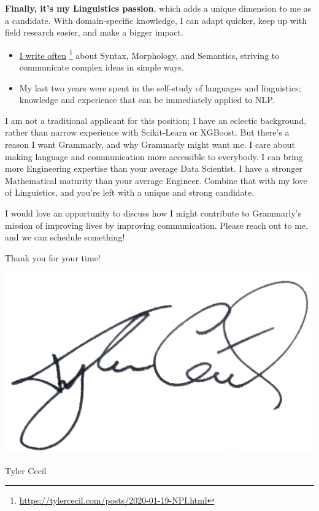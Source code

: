 \documentclass[a4paper]{article}
\newcommand{\cvcolor}[1]{{\color{MidnightBlue}#1}}
\renewcommand{\hl}[1]{\cvcolor{\textbf{#1}}}
\renewcommand{\cite}[2]{\href{#2}{\ul{#1}} \footnote{\href{#2}{#2}}}
\begin{document}
\begin{adjustwidth}{40pt}{40pt}
  \hl{Finally, it's my Linguistics passion}, which adds a unique dimension to
  me as a candidate. With domain-specific knowledge, I can adapt quicker, keep
  up with field research easier, and make a bigger impact.
  \begin{itemize}
    \item \cite{I write
      often}{https://tylercecil.com/posts/2020-01-19-NPI.html} about Syntax,
      Morphology, and Semantics, striving to communicate complex ideas in
      simple ways.
    \item My last two years were spent in the self-study of languages and
      linguistics; knowledge and experience that can be immediately applied to
      NLP.
  \end{itemize}\medskip

  I am not a traditional applicant for this position; I have an eclectic
  background, rather than narrow experience with Scikit-Learn or XGBoost.  But
  there's a reason I want Grammarly, and why Grammarly might want me. I care
  about making language and communication more accessible to everybody. I can
  bring more Engineering expertise than your average Data Scientist. I have a
  stronger Mathematical maturity than your average Engineer. Combine that with
  my love of Linguistics, and you're left with a unique and strong candidate.
  \medskip

  I would love an opportunity to discuss how I might contribute to Grammarly's
  mission of improving lives by improving communication. Please reach out to
  me, and we can schedule something!  \bigskip

  Thank you for your time!

  \vspace{-0.75em}
  \includegraphics[height=5\baselineskip]{sig}
  \vspace{-0.75em}

  Tyler Cecil
\end{adjustwidth}
\end{document}

